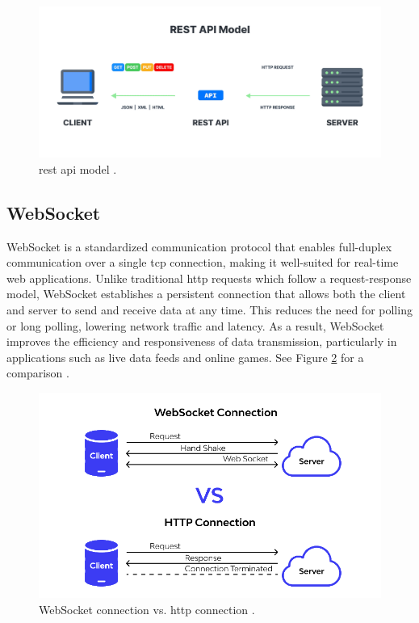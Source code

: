 \begin{figure}[h!]
\centering
\includegraphics[width=0.95\linewidth]{figures/theory/rest.png}
\caption[REST API model]{\gls{rest} \gls{api} model \cite{medium:rest}.}
\label{fig:rest-api-model}
\end{figure}

\subsection{WebSocket}
\label{subsec:websocket}

WebSocket is a standardized communication protocol that enables full-duplex communication over a single \gls{tcp} connection, making it well-suited for real-time web applications. Unlike traditional \gls{http} requests which follow a request-response model, WebSocket establishes a persistent connection that allows both the client and server to send and receive data at any time. This reduces the need for polling or long polling, lowering network traffic and latency. As a result, WebSocket improves the efficiency and responsiveness of data transmission, particularly in applications such as live data feeds and online games. See Figure \ref{fig:websocket-vs-http} for a comparison \cite{nodejs:websocket, apidog:websocket}.

\begin{figure}[h!]
    \centering
    \includegraphics[width=0.8\linewidth]{figures/theory/websocket-vs-http.png}
    \caption[WebSocket connection vs. HTTP connection]{WebSocket connection vs. \gls{http} connection \cite{apidog:websocket}.}
    \label{fig:websocket-vs-http}
\end{figure}

